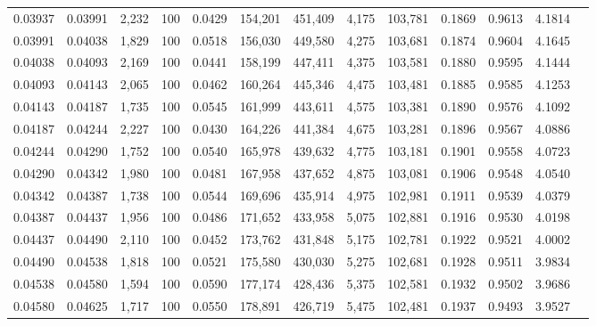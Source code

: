 \begin{tabular}{rrrrrrrrrrrrr}
0.03937 & 0.03991 & 2,232 & 100 &                                     0.0429 & 154,201 & 451,409 &   4,175 & 103,781 & 0.1869 & 0.9613 & 4.1814 \\
0.03991 & 0.04038 & 1,829 & 100 &                                     0.0518 & 156,030 & 449,580 &   4,275 & 103,681 & 0.1874 & 0.9604 & 4.1645 \\
0.04038 & 0.04093 & 2,169 & 100 &                                     0.0441 & 158,199 & 447,411 &   4,375 & 103,581 & 0.1880 & 0.9595 & 4.1444 \\
0.04093 & 0.04143 & 2,065 & 100 &                                     0.0462 & 160,264 & 445,346 &   4,475 & 103,481 & 0.1885 & 0.9585 & 4.1253 \\
0.04143 & 0.04187 & 1,735 & 100 &                                     0.0545 & 161,999 & 443,611 &   4,575 & 103,381 & 0.1890 & 0.9576 & 4.1092 \\
0.04187 & 0.04244 & 2,227 & 100 &                                     0.0430 & 164,226 & 441,384 &   4,675 & 103,281 & 0.1896 & 0.9567 & 4.0886 \\
0.04244 & 0.04290 & 1,752 & 100 &                                     0.0540 & 165,978 & 439,632 &   4,775 & 103,181 & 0.1901 & 0.9558 & 4.0723 \\
0.04290 & 0.04342 & 1,980 & 100 &                                     0.0481 & 167,958 & 437,652 &   4,875 & 103,081 & 0.1906 & 0.9548 & 4.0540 \\
0.04342 & 0.04387 & 1,738 & 100 &                                     0.0544 & 169,696 & 435,914 &   4,975 & 102,981 & 0.1911 & 0.9539 & 4.0379 \\
0.04387 & 0.04437 & 1,956 & 100 &                                     0.0486 & 171,652 & 433,958 &   5,075 & 102,881 & 0.1916 & 0.9530 & 4.0198 \\
0.04437 & 0.04490 & 2,110 & 100 &                                     0.0452 & 173,762 & 431,848 &   5,175 & 102,781 & 0.1922 & 0.9521 & 4.0002 \\
0.04490 & 0.04538 & 1,818 & 100 &                                     0.0521 & 175,580 & 430,030 &   5,275 & 102,681 & 0.1928 & 0.9511 & 3.9834 \\
0.04538 & 0.04580 & 1,594 & 100 &                                     0.0590 & 177,174 & 428,436 &   5,375 & 102,581 & 0.1932 & 0.9502 & 3.9686 \\
0.04580 & 0.04625 & 1,717 & 100 &                                     0.0550 & 178,891 & 426,719 &   5,475 & 102,481 & 0.1937 & 0.9493 & 3.9527 \\

\end{tabular}
